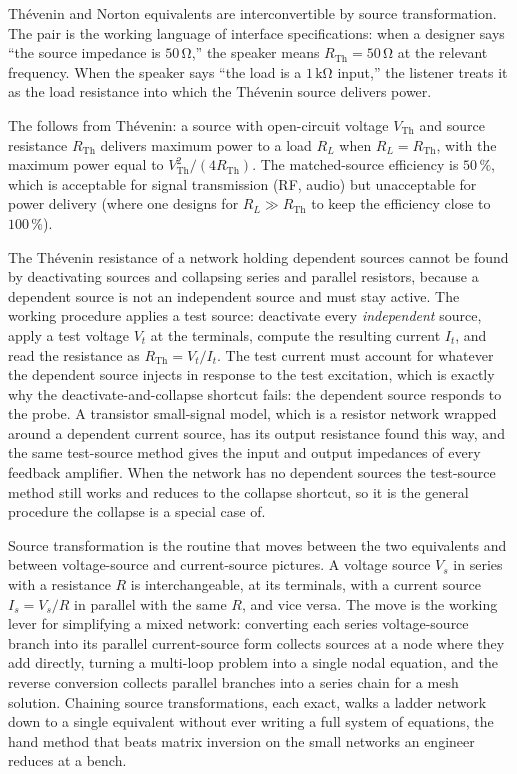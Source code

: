 

Th\'evenin and Norton equivalents are interconvertible by source
transformation. The pair is the working language of interface
specifications: when a designer says ``the source impedance is
$50\,\si{\ohm}$,'' the speaker means $R_{\text{Th}} = 50\,\si{\ohm}$
at the relevant frequency. When the speaker says ``the load is a
$1\,\si{\kilo\ohm}$ input,'' the listener treats it as the load
resistance into which the Th\'evenin source delivers power.

The  follows from Th\'evenin:
a source with open-circuit voltage $V_{\text{Th}}$ and source
resistance $R_{\text{Th}}$ delivers maximum power to a load $R_{L}$
when $R_{L} = R_{\text{Th}}$, with the maximum power equal to
$V_{\text{Th}}^{2}/(4R_{\text{Th}})$. The matched-source efficiency is
$50\,\%$, which is acceptable for signal transmission (RF, audio) but
unacceptable for power delivery (where one designs for $R_{L} \gg
R_{\text{Th}}$ to keep the efficiency close to $100\,\%$).

The Th\'evenin resistance of a network holding dependent sources cannot be found
by deactivating sources and collapsing series and parallel resistors, because a
dependent source is not an independent source and must stay active. The working
procedure applies a test source: deactivate every \emph{independent} source,
apply a test voltage $V_t$ at the terminals, compute the resulting current
$I_t$, and read the resistance as $R_{\text{Th}} = V_t/I_t$. The test current
must account for whatever the dependent source injects in response to the test
excitation, which is exactly why the deactivate-and-collapse shortcut fails: the
dependent source responds to the probe. A transistor small-signal model, which
is a resistor network wrapped around a dependent current source, has its output
resistance found this way, and the same test-source method gives the input and
output impedances of every feedback amplifier. When the network has no dependent
sources the test-source method still works and reduces to the collapse shortcut,
so it is the general procedure the collapse is a special case of.

Source transformation is the routine that moves between the two equivalents and
between voltage-source and current-source pictures. A voltage source $V_s$ in
series with a resistance $R$ is interchangeable, at its terminals, with a current
source $I_s = V_s/R$ in parallel with the same $R$, and vice versa. The move is
the working lever for simplifying a mixed network: converting each series
voltage-source branch into its parallel current-source form collects sources at
a node where they add directly, turning a multi-loop problem into a single nodal
equation, and the reverse conversion collects parallel branches into a series
chain for a mesh solution. Chaining source transformations, each exact, walks a
ladder network down to a single equivalent without ever writing a full system of
equations, the hand method that beats matrix inversion on the small networks an
engineer reduces at a bench.

